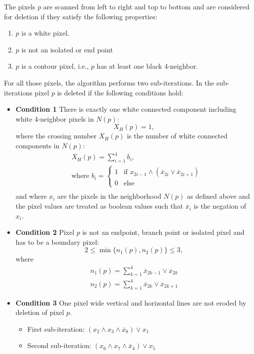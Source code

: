 \documentclass{article}
\begin{document}
The pixels $p$ are scanned from left to right and top to bottom and are considered for deletion if they satisfy the following properties:
\begin{enumerate}
\item $p$ is a white pixel.
\item $p$ is not an isolated or end point
\item $p$ is a contour pixel, i.e., $p$ has at least one black 4-neighbor.
\end{enumerate}
For all those pixels, the algorithm performs two sub-iterations. In the sub-iterations pixel $p$ is deleted if the following conditions hold:
\begin{itemize}
\item \textbf{Condition 1} There is exactly one white connected component including white 4-neighbor pixels in $N(p)$:
\begin{equation*}
X_H(p)=1, 
\end{equation*}
where the crossing number $X_H(p)$ is the number of white connected components in $N(p)$:
\begin{align*}
& X_H(p) = \sum_{i=1}^4 b_i,\\\nonumber
& \text{where }
b_i=\begin{cases}
1 & \text{if } x_{2i-1} \wedge (\overline{x}_{2i} \vee \overline{x}_{2i+1})\\
0 & \text{else}
\end{cases} \\
\end{align*}
and where $x_i$ are the pixels in the neighborhood $N(p)$ as defined above and the pixel values are treated as boolean values such that $\overline{x}_i$ is the negation of $x_i$.

\item \textbf{Condition 2} Pixel $p$ is not an endpoint, branch point or isolated pixel and has to be a boundary pixel:
\begin{equation*}
2\leq \min\{n_1(p), n_2(p)\} \leq 3,
\end{equation*}
where
\begin{align*}
n_1(p) = \sum_{k=1}^4 \overline{x}_{2k-1}\vee \overline{x}_{2k}\\
n_2(p) = \sum_{k=1}^4 \overline{x}_{2k}\vee \overline{x}_{2k+1}
\end{align*}
\item \textbf{Condition 3} One pixel wide vertical and horizontal lines are not eroded by deletion of pixel $p$.
\begin{itemize}
\item First sub-iteration: $(x_2 \wedge x_3 \wedge \overline{x}_8) \vee x_1$
\item Second sub-iteration: $(x_6 \wedge x_7 \wedge \overline{x}_4) \vee x_5$
\end{itemize}
\end{itemize}
\end{document}
